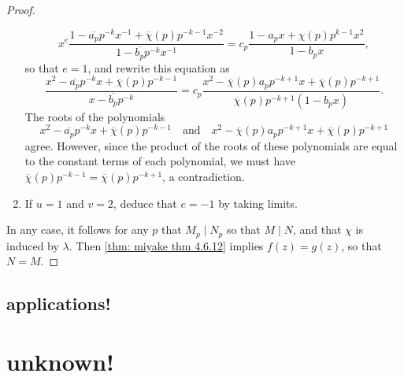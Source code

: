 \documentclass[10pt,leqno,twoside]{article}
\theoremstyle{plain}
\theoremstyle{definition}
\numberwithin{equation}{section}
\numberwithin{lem}{section}
\newcommand{\sai}[1]{\textcolor{red}{#1}}
\begin{document}
\begin{proof}
\begin{enumerate}[label=(\arabic*)]
        \[x^e\frac{1-\overline{a_p}p^{-k}x^{-1} + \overline{\chi}(p)p^{-k-1}x^{-2}}{1-\overline{b_p}p^{-k}x^{-1}} = c_p\frac{1-a_px + \chi(p)p^{k-1}x^2}{1-b_px},\] so that $e = 1$, and rewrite this equation as 
        \[\frac{x^2-\overline{a_p}p^{-k}x + \overline \chi(p)p^{-k-1}}{x-\overline{b_p}p^{-k}} = c_p\frac{x^2-\overline\chi(p)a_pp^{-k+1}x + \overline\chi(p)p^{-k+1}}{\overline\chi(p)p^{-k+1}(1-b_px)}.\] The roots of the polynomials 
        \[x^2-\overline{a_p}p^{-k}x + \overline \chi(p)p^{-k-1}\quad \text{and}\quad x^2-\overline\chi(p)a_pp^{-k+1}x + \overline\chi(p)p^{-k+1}\] agree. However, since the product of the roots of these polynomials are equal to the constant terms of each polynomial, we must have $\overline \chi(p)p^{-k-1} = \overline\chi(p)p^{-k+1}$, a contradiction. 
        
        \item If $u = 1$ and $v = 2$, deduce that $e = -1$ by taking limits.
    \end{enumerate}
    In any case, it follows for any $p$ that $M_p\mid N_p$ so that $M\mid N$, and that $\chi$ is induced by $\lambda$. Then \cref{thm: miyake thm 4.6.12} implies $f(z) = g(z)$, so that $N = M$.
\end{proof}
\subsection{applications!}

\newpage\section{unknown!}
\end{document}
